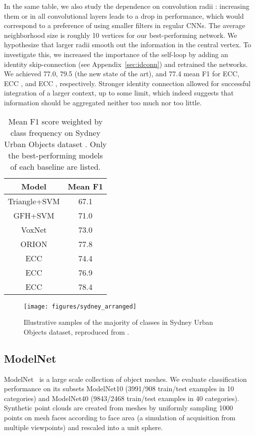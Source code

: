 \documentclass[10pt,twocolumn,letterpaper]{article}
\begin{document}
In the same table, we also study the dependence on convolution radii : increasing them  or  in all convolutional layers leads to a drop in performance, which would correspond to a preference of using smaller filters in regular CNNs. The average neighborhood size is roughly 10 vertices for our best-performing network.
We hypothesize that larger radii smooth out the information in the central vertex. 
To investigate this, we increased the importance of the self-loop by adding an identity skip-connection (see Appendix~\ref{sec:idconn}) and retrained the networks. We achieved 77.0, 79.5 (the new state of the art), and 77.4 mean F1 for ECC, ECC , and ECC , respectively. Stronger identity connection allowed for successful integration of a larger context, up to some limit, which indeed suggests that information should be aggregated neither too much nor too little.


\begin{table}[bt]
\centering
\begin{tabular}{cc}
\toprule
Model & Mean F1\tabularnewline
\midrule
Triangle+SVM \cite{trianglesvm}& 67.1 \tabularnewline
GFH+SVM \cite{gfhsvm} & 71.0 \tabularnewline
VoxNet \cite{voxnet} & 73.0 \tabularnewline
ORION \cite{orion} & 77.8\tabularnewline
\midrule
ECC  & 74.4 \tabularnewline
ECC  & 76.9 \tabularnewline
ECC & 78.4\tabularnewline
\bottomrule
\end{tabular}
\vspace{1.5ex}
\caption{\label{tab:respc}
Mean F1 score weighted by class frequency on Sydney Urban Objects dataset \cite{trianglesvm}. Only the best-performing models of each baseline are listed.}
\end{table}

\begin{figure}[bt]
\centering
\texttt{[image: figures/sydney\_arranged]}
\vspace{1.5ex}
\caption{\label{fig:sydney} Illustrative samples of the majority of classes in Sydney Urban Objects dataset, reproduced from \cite{trianglesvm}.}
\end{figure}




\subsection{ModelNet} \label{subsec:evalmn}

ModelNet~\cite{modelnet} is a large scale collection of object meshes. We evaluate classification performance on its subsets ModelNet10 (3991/908 train/test examples in 10 categories) and ModelNet40 (9843/2468 train/test examples in 40 categories). Synthetic point clouds are created from meshes by uniformly sampling 1000 points on mesh faces according to face area (a simulation of acquisition from multiple viewpoints) and rescaled into a unit sphere.
\end{document}

